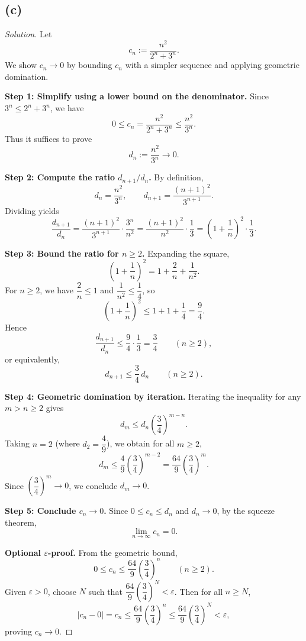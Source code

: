 \documentclass[12pt,a4paper]{article}
\theoremstyle{definition}
\theoremstyle{remark}
\newenvironment{solution}{\begin{proof}[Solution]}{\end{proof}}
\begin{document}
\subsection*{(c)}
\begin{solution}
Let
\[
c_n:=\frac{n^2}{2^n+3^n}.
\]
We show $c_n\to 0$ by bounding $c_n$ with a simpler sequence and applying geometric domination.

\textbf{Step 1: Simplify using a lower bound on the denominator.}
Since $3^n\le 2^n+3^n$, we have
\[
0\le c_n=\frac{n^2}{2^n+3^n}\le \frac{n^2}{3^n}.
\]
Thus it suffices to prove
\[
d_n:=\frac{n^2}{3^n}\longrightarrow 0.
\]

\textbf{Step 2: Compute the ratio $d_{n+1}/d_n$.}
By definition,
\[
d_n=\frac{n^2}{3^n},\qquad d_{n+1}=\frac{(n+1)^2}{3^{n+1}}.
\]
Dividing yields
\[
\frac{d_{n+1}}{d_n}
=\frac{(n+1)^2}{3^{n+1}}\cdot\frac{3^n}{n^2}
=\frac{(n+1)^2}{n^2}\cdot\frac{1}{3}
=\left(1+\frac{1}{n}\right)^2\cdot\frac{1}{3}.
\]

\textbf{Step 3: Bound the ratio for $n\ge 2$.}
Expanding the square,
\[
\left(1+\frac{1}{n}\right)^2
=1+\frac{2}{n}+\frac{1}{n^2}.
\]
For $n\ge 2$, we have $\dfrac{2}{n}\le 1$ and $\dfrac{1}{n^2}\le \dfrac{1}{4}$, so
\[
\left(1+\frac{1}{n}\right)^2
\le 1+1+\frac{1}{4}=\frac{9}{4}.
\]
Hence
\[
\frac{d_{n+1}}{d_n}
\le \frac{9}{4}\cdot\frac{1}{3}=\frac{3}{4}
\qquad(n\ge 2),
\]
or equivalently,
\[
d_{n+1}\le \frac{3}{4}\,d_n\qquad(n\ge 2).
\]

\textbf{Step 4: Geometric domination by iteration.}
Iterating the inequality for any $m>n\ge 2$ gives
\[
d_m \le d_n\left(\frac{3}{4}\right)^{m-n}.
\]
Taking $n=2$ (where $d_2=\dfrac{4}{9}$), we obtain for all $m\ge 2$,
\[
d_m \le \frac{4}{9}\left(\frac{3}{4}\right)^{m-2}
= \frac{64}{9}\left(\frac{3}{4}\right)^{m}.
\]
Since $\left(\dfrac{3}{4}\right)^m\to 0$, we conclude $d_m\to 0$.

\textbf{Step 5: Conclude $c_n\to 0$.}
Since $0\le c_n\le d_n$ and $d_n\to 0$, by the squeeze theorem,
\[
\boxed{\lim_{n\to\infty} c_n=0.}
\]

\textbf{Optional $\varepsilon$-proof.}
From the geometric bound,
\[
0\le c_n \le \frac{64}{9}\left(\frac{3}{4}\right)^n\qquad(n\ge 2).
\]
Given $\varepsilon>0$, choose $N$ such that $\dfrac{64}{9}\left(\dfrac{3}{4}\right)^N<\varepsilon$. Then for all $n\ge N$,
\[
|c_n-0|=c_n\le \frac{64}{9}\left(\frac{3}{4}\right)^n\le \frac{64}{9}\left(\frac{3}{4}\right)^N<\varepsilon,
\]
proving $c_n\to 0$.
\end{solution}
\end{document}
